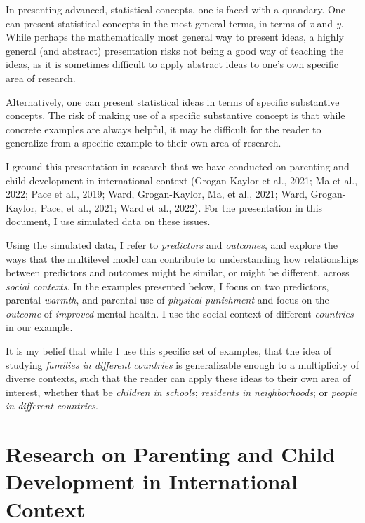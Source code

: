 \documentclass[
  letterpaper,
  DIV=11,
  numbers=noendperiod]{scrreprt}
\begin{document}
In presenting advanced, statistical concepts, one is faced with a
quandary. One can present statistical concepts in the most general
terms, in terms of \emph{x} and \emph{y}. While perhaps the
mathematically most general way to present ideas, a highly general (and
abstract) presentation risks not being a good way of teaching the ideas,
as it is sometimes difficult to apply abstract ideas to one's own
specific area of research.

Alternatively, one can present statistical ideas in terms of specific
substantive concepts. The risk of making use of a specific substantive
concept is that while concrete examples are always helpful, it may be
difficult for the reader to generalize from a specific example to their
own area of research.

I ground this presentation in research that we have conducted on
parenting and child development in international context (Grogan-Kaylor
et al., 2021; Ma et al., 2022; Pace et al., 2019; Ward, Grogan-Kaylor,
Ma, et al., 2021; Ward, Grogan-Kaylor, Pace, et al., 2021; Ward et al.,
2022). For the presentation in this document, I use simulated data on
these issues.

Using the simulated data, I refer to \emph{predictors} and
\emph{outcomes}, and explore the ways that the multilevel model can
contribute to understanding how relationships between predictors and
outcomes might be similar, or might be different, across \emph{social
contexts}. In the examples presented below, I focus on two predictors,
parental \emph{warmth}, and parental use of \emph{physical punishment}
and focus on the \emph{outcome} of \emph{improved} mental health. I use
the social context of different \emph{countries} in our example.

It is my belief that while I use this specific set of examples, that the
idea of studying \emph{families in different countries} is generalizable
enough to a multiplicity of diverse contexts, such that the reader can
apply these ideas to their own area of interest, whether that be
\emph{children in schools}; \emph{residents in neighborhoods}; or
\emph{people in different countries}.

\hypertarget{research-on-parenting-and-child-development-in-international-context}{%
\section{Research on Parenting and Child Development in International
Context}\label{research-on-parenting-and-child-development-in-international-context}}
\end{document}
